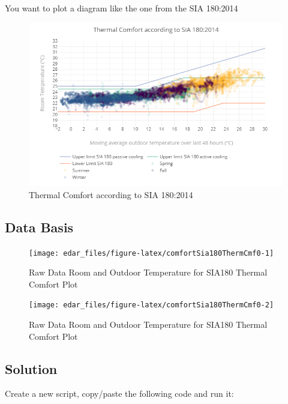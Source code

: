 \documentclass[
  a4paperpaper,
]{book}
\begin{document}
You want to plot a diagram like the one from the SIA 180:2014

\begin{figure}
\includegraphics[width=0.7\linewidth]{images/comfortSia180ThermCmf} \caption{Thermal Comfort according to SIA 180:2014}\label{fig:unnamed-chunk-31}
\end{figure}

\hypertarget{data-basis-20}{%
\subsection{Data Basis}\label{data-basis-20}}

\begin{figure}
\texttt{[image: edar\_files/figure-latex/comfortSia180ThermCmf0-1]} \caption{Raw Data Room and Outdoor Temperature for SIA180 Thermal Comfort Plot}\label{fig:comfortSia180ThermCmf0-1}
\end{figure}
\begin{figure}
\texttt{[image: edar\_files/figure-latex/comfortSia180ThermCmf0-2]} \caption{Raw Data Room and Outdoor Temperature for SIA180 Thermal Comfort Plot}\label{fig:comfortSia180ThermCmf0-2}
\end{figure}

\newpage

\hypertarget{solution-20}{%
\subsection{Solution}\label{solution-20}}

Create a new script, copy/paste the following code and run it:
\end{document}
